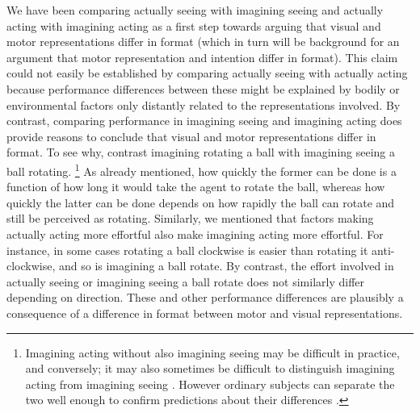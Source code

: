 \documentclass[12pt,\papersize]{extarticle}
\begin{document}
We have been comparing actually seeing with imagining seeing and actually acting with imagining acting as a first step towards arguing that visual and motor representations differ in format (which in turn will be background for an argument that motor representation and intention differ in format).  This claim could not easily be established by comparing actually seeing with actually acting because performance differences between these might be explained by bodily or environmental factors only distantly related to the representations involved. By contrast, comparing performance in imagining seeing and imagining acting does provide reasons to conclude that visual and motor representations differ in format. To see why, contrast imagining rotating a ball with imagining seeing a ball rotating.%
\footnote{Imagining acting without also imagining seeing may be difficult in practice, and conversely; it may also sometimes be difficult to distinguish imagining acting from imagining seeing \citep[as][p.\ 170 suggest]{currie:1997_mental}. However ordinary subjects can separate the two well enough to confirm predictions about their differences \citep[see, e.g.,][]{kosslyn:2001_imagining}.
}
As already mentioned, how quickly the former can be done is a function of how long it would take the agent to rotate the ball, whereas how quickly the latter can be done depends on how rapidly the ball can rotate and still be perceived as rotating. Similarly, we mentioned that factors making actually acting more effortful also make imagining acting more effortful. For instance, in some cases rotating a ball clockwise is easier than rotating it anti-clockwise, and so is imagining a ball rotate.  By contrast, the effort involved in actually seeing or imagining seeing a ball rotate does not similarly differ depending on direction.  These and other performance differences are plausibly a consequence of a difference in format between motor and visual representations.
\end{document}
